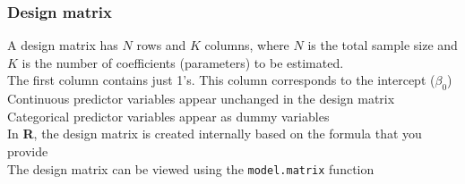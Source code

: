 \documentclass[color=usenames,dvipsnames]{beamer}\usepackage[]{graphicx}\usepackage[]{color}
\newcommand{\inr}[1]{\colorbox{inlinecolor}{\texttt{#1}}}
\begin{document}
\begin{frame}%
  \frametitle{Design matrix}
  A design matrix has $N$ rows and $K$ columns, where $N$ is
      the total sample size and $K$ is the number of coefficients (parameters)
      to be estimated. \\
 \pause
 \vfill
      The first column contains just 1's. This column corresponds
      to the intercept ($\beta_0$) \\
 \pause
 \vfill
      Continuous predictor variables appear unchanged in the design
      matrix \\
 \pause
 \vfill
      Categorical predictor variables appear as dummy variables \\
 \pause
 \vfill
      In {\bf R}, the design matrix is created internally based on
      the formula that you provide \\
 \pause
 \vfill
      The design matrix can be viewed using the \inr{model.matrix} function
\end{frame}
\end{document}

